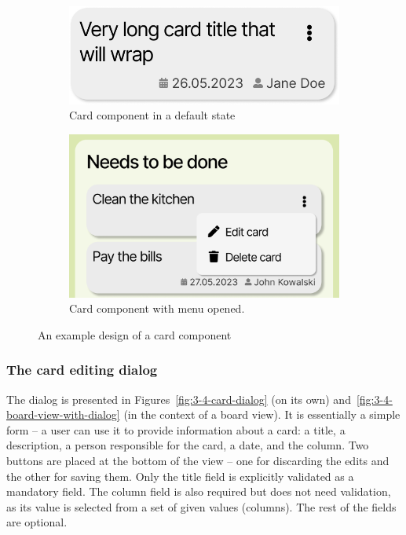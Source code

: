 \begin{figure}
    \centering
    \begin{subfigure}[m]{0.45\textwidth}
        \centering
        \includegraphics[width=\textwidth]{./3-research-methodology/card-component}
        \caption{Card component in a default state}
        \label{fig:3-4-card-component-plain}
    \end{subfigure}
    \hfill
    \begin{subfigure}[m]{0.45\textwidth}
        \centering
        \includegraphics[width=\textwidth]{./3-research-methodology/card-component-with-menu}
        \caption{Card component with menu opened.}
        \label{fig:3-4-card-component-with-menu}
    \end{subfigure}
    \caption{An example design of a card component}
    \label{fig:3-4-card-component}
\end{figure}

\subsubsection{The card editing dialog}
The dialog is presented in Figures~\ref{fig:3-4-card-dialog} (on its own) and~\ref{fig:3-4-board-view-with-dialog} (in the context of a board view).
It is essentially a simple form -- a user can use it to provide information about a card: a title, a description, a person responsible for the card, a date, and the column.
Two buttons are placed at the bottom of the view -- one for discarding the edits and the other for saving them.
Only the title field is explicitly validated as a mandatory field.
The column field is also required but does not need validation, as its value is selected from a set of given values (columns).
The rest of the fields are optional.

